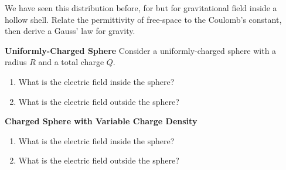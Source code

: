 \documentclass{../../oss-handout}
\begin{document}
We have seen this distribution before, for but for gravitational field inside a
hollow shell. Relate the permittivity of free-space to the Coulomb's constant,
then derive a Gauss' law for gravity.
\vspace{1.25in}
\newpage

\textbf{Uniformly-Charged Sphere}
Consider a uniformly-charged sphere with a radius $R$ and a total charge $Q$.
\begin{enumerate}[nosep]
\item What is the electric field inside the sphere?
\item What is the electric field outside the sphere?
\end{enumerate}
\vspace{\stretch1}
\begin{center}
\end{center}
\newpage

\textbf{Charged Sphere with Variable Charge Density}
\begin{enumerate}[nosep]
\item What is the electric field inside the sphere?
\item What is the electric field outside the sphere?
\end{enumerate}
\vspace{\stretch1}
\begin{center}
\end{center}
\newpage
\end{document}
